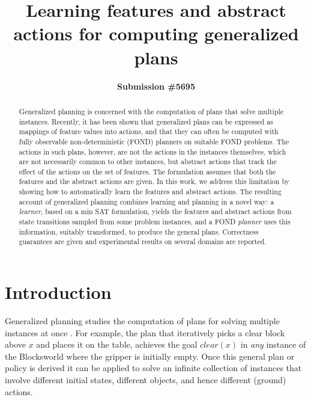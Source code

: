 \documentclass[letterpaper]{article} %
\title{Learning features and abstract actions for computing generalized plans}
\author{\textbf{Submission \#5695}}
\begin{document}
\maketitle

\begin{abstract}
  Generalized planning is concerned with the computation of plans that solve multiple instances.
  Recently, it has been shown that generalized plans can be expressed as mappings of feature
  values into actions, and that they can often be computed with fully observable non-deterministic
  (FOND) planners on suitable FOND problems. %
  The actions in such plans, however, are not the actions in the instances themselves, which are
  not necessarily common to  other instances, but abstract actions that track the effect of the
  actions on the set of features. The formulation assumes that both the features and the abstract
  actions are given.
  In this work, we address this limitation by showing how to automatically learn the features and
  abstract actions. The resulting account of generalized planning combines learning and planning
  in a novel way: a \emph{learner}, based on a min SAT formulation, yields the features and abstract
  actions from state transitions sampled from some problem instances, and a FOND \emph{planner}
  uses this information, suitably transformed, to produce the general plans.
  Correctness guarantees are given and experimental results on several domains are reported.
\end{abstract}



\section{Introduction}

Generalized planning studies the computation of plans for  solving  multiple  instances at once
\cite{srivastava08learning,bonet09automatic,srivastava:generalized,hu:generalized,BelleL16,anders:generalized}.
For example, the plan  that iteratively  picks  a  clear block above $x$ 
and places it  on the table, achieves the goal $clear(x)$
in \emph{any} instance of the Blocksworld where the gripper is initially empty.
Once this  general plan or  policy is derived it can be  applied to solve an infinite collection
of instances that involve different initial states, different objects, and hence  different (ground)  actions. 
\end{document}
